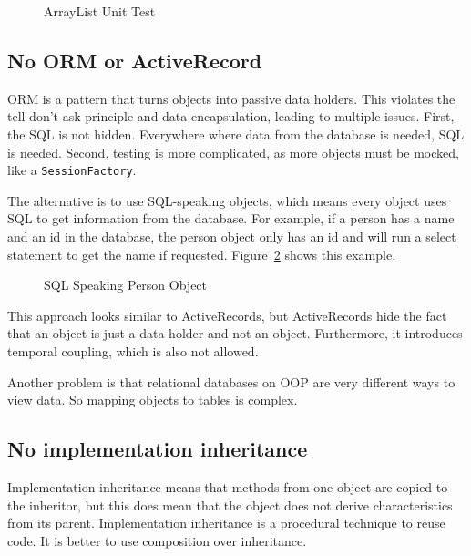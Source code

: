 \begin{figure}[h]
    \caption{ArrayList Unit Test}
    
    \label{fig:arraylist-unit-test}
\end{figure}

\subsection{No ORM or ActiveRecord}\label{subsec:no-orm-or-activerecord}
ORM is a pattern that turns objects into passive data holders.
This violates the tell-don't-ask principle and data encapsulation, leading to multiple issues.
First, the SQL is not hidden.
Everywhere where data from the database is needed, SQL is needed.
Second, testing is more complicated, as more objects must be mocked, like a \texttt{SessionFactory}.

The alternative is to use SQL-speaking objects, which means every object uses SQL to get information from the database.
For example, if a person has a name and an id in the database, the person object only has an id and will run a select statement to get the name if requested.
Figure\ \ref{fig:sql-speaking-person-object} shows this example.

\begin{figure}[h]
    \caption{SQL Speaking Person Object}
    
    \label{fig:sql-speaking-person-object}
\end{figure}

This approach looks similar to ActiveRecords, but ActiveRecords hide the fact that an object is just a data holder and not an object.
Furthermore, it introduces temporal coupling, which is also not allowed.

Another problem is that relational databases on \Gls{OOP} are very different ways to view data.
So mapping objects to tables is complex.\cite{orm-vietnam-of-cs,tell-dont-ask-martin-fowler,elegant-objects}

\subsection{No implementation inheritance}\label{subsec:no-implementation-inheritance}
Implementation inheritance means that methods from one object are copied to the inheritor, but this does mean that the object does not derive characteristics from its parent.
Implementation inheritance is a procedural technique to reuse code.
It is better to use composition over inheritance.\cite{elegant-objects}